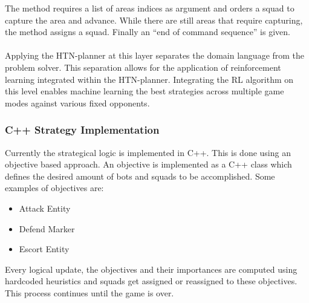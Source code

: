 The method requires a list of areas indices as argument and orders a squad to
capture the area and advance. While there are still areas that require
capturing, the method assigns a squad. Finally an ``end of command sequence''
is given.
\\\\
Applying the HTN-planner at this layer separates the domain language from the
problem solver. This separation allows for the application of reinforcement
learning integrated within the HTN-planner. Integrating the RL algorithm on
this level enables machine learning the best strategies across multiple game
modes against various fixed opponents.
\subsubsection{C++ Strategy Implementation}
Currently the strategical logic is implemented in C++. This is done using an
objective based approach. An objective is implemented as a C++ class which
defines the desired amount of bots and squads to be accomplished. Some examples
of objectives are:
\begin{itemize}
\item{Attack Entity}
\item{Defend Marker}
\item{Escort Entity}
\end{itemize}
Every logical update, the objectives and their importances are computed using
hardcoded heuristics and squads get assigned or reassigned to these objectives.
This process continues until the game is over.

